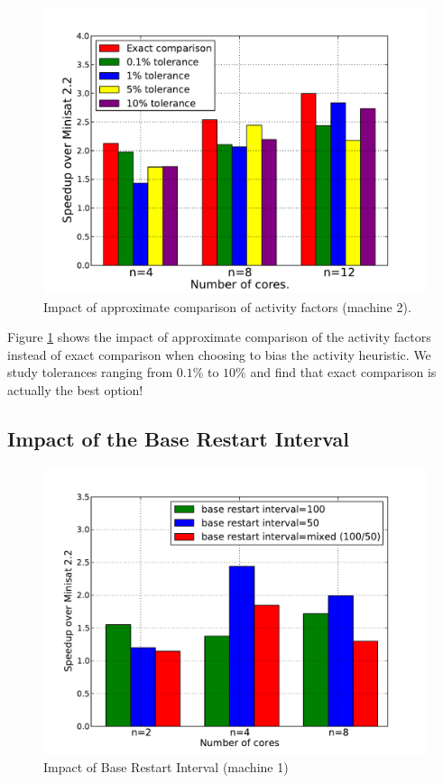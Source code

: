 \documentclass[letterpaper, compsoc, conference]{IEEEtran}
\begin{document}
\begin{figure}[htbp]
  \includegraphics[width=\columnwidth]{images/aff.pdf}
  \caption{Impact of approximate comparison of activity factors (machine 2).}
  \label{fig:aff}
\end{figure}

Figure \ref{fig:aff} shows the impact of approximate comparison of the activity
factors instead of exact comparison when choosing to bias the activity heuristic.
We study tolerances ranging from $0.1\%$ to $10\%$ and find that exact comparison
is actually the best option!

\subsection{Impact of the Base Restart Interval}

\begin{figure}[htbp]
  \includegraphics[width=\columnwidth]{images/restart_speedup1.pdf}
  \caption{Impact of Base Restart Interval (machine 1)}
  \label{fig:restart}
\end{figure}
\end{document}
